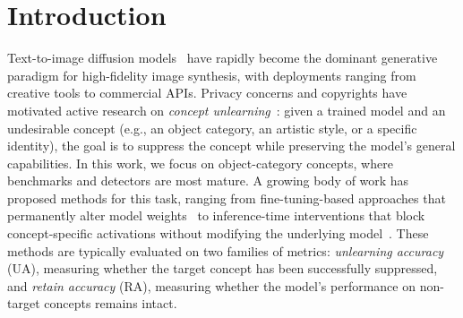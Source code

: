 \section{Introduction}
\label{sec:intro}
Text-to-image diffusion models~\citep{ho2020denoising, rombach2022high, saharia2022photorealistic} have rapidly become the dominant generative paradigm for high-fidelity image synthesis, with deployments ranging from creative tools to commercial APIs.
Privacy concerns and copyrights have motivated active research on \emph{concept unlearning}~\citep{gandikota2023erasing}: given a trained model and an undesirable concept (e.g., an object category, an artistic style, or a specific identity), the goal is to suppress the concept while preserving the model's general capabilities. In this work, we focus on object-category concepts, where benchmarks and detectors are most mature.
A growing body of work has proposed methods for this task, ranging from fine-tuning-based approaches that permanently alter model weights~\citep{gandikota2023erasing,fan2023salun,zhang2024defensive,srivatsan2025stereo} to inference-time interventions that block concept-specific activations without modifying the underlying model~\citep{li2024get,lyu2024one,cywinski2025saeuron}. These methods are typically evaluated on two families of metrics: \emph{unlearning accuracy} (UA), measuring whether the target concept has been successfully suppressed, and \emph{retain accuracy} (RA), measuring whether the model's performance on non-target concepts remains intact.

